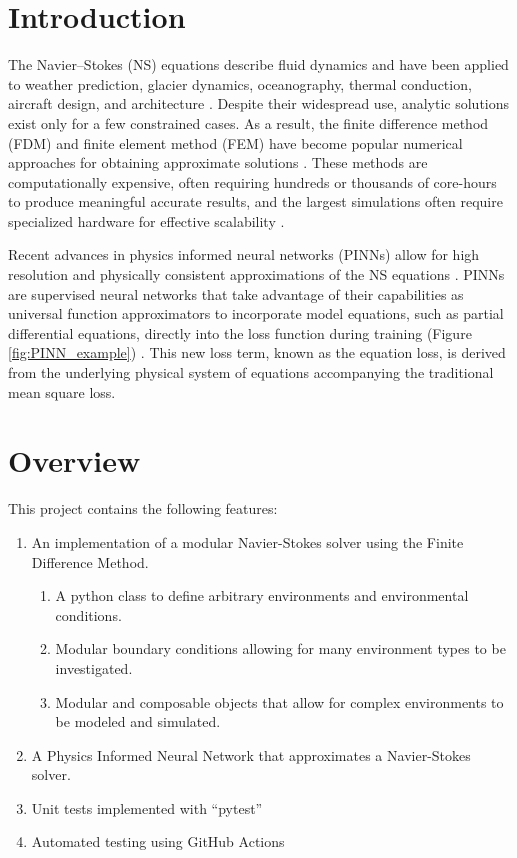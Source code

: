 \section{Introduction}
The Navier–Stokes (NS) equations describe fluid dynamics and have been applied to weather prediction, glacier dynamics, oceanography, thermal conduction, aircraft design, and architecture \cite{chorin1968numerical}. Despite their widespread use, analytic solutions exist only for a few constrained cases. As a result, the finite difference method (FDM) and finite element method (FEM) have become popular numerical approaches for obtaining approximate solutions \cite{Whiteley2017}. These methods are computationally expensive, often requiring hundreds or thousands of core-hours to produce meaningful accurate results, and the largest simulations often require specialized hardware for effective scalability \cite{michalakes2007wrf}. 



Recent advances in physics informed neural networks (PINNs) allow for high resolution and physically consistent approximations of the NS equations \cite{jin2021nsfnets} \cite{baymani2015artificial} \cite{eivazi2022physics}. PINNs are supervised neural networks that take advantage of their capabilities as universal function approximators to incorporate model equations, such as partial differential equations, directly into the loss function during training (Figure \ref{fig:PINN_example}) \cite{Raissi2019}. This new loss term, known as the equation loss, is derived from the underlying physical system of equations accompanying the traditional mean square loss.

\section{Overview}
This project contains the following features:

\begin{enumerate}
    \item An implementation of a modular Navier-Stokes solver using the Finite Difference Method.
        \begin{enumerate}
            \item A python class to define arbitrary environments and environmental conditions.
            \item Modular boundary conditions allowing for many environment types to be investigated.
            \item Modular and composable objects that allow for complex environments to be modeled and simulated.
        \end{enumerate}
    \item A Physics Informed Neural Network that approximates a Navier-Stokes solver.
    \item Unit tests implemented with ``pytest''
    \item Automated testing using GitHub Actions
\end{enumerate}